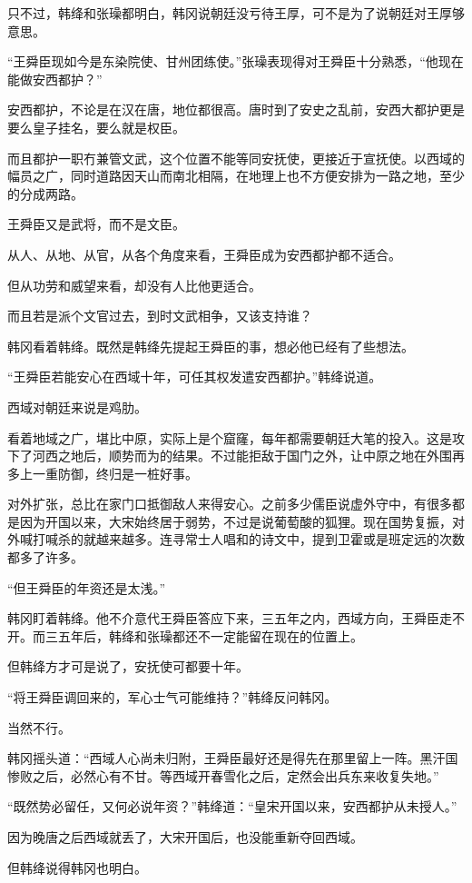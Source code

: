 只不过，韩绛和张璪都明白，韩冈说朝廷没亏待王厚，可不是为了说朝廷对王厚够意思。

“王舜臣现如今是东染院使、甘州团练使。”张璪表现得对王舜臣十分熟悉，“他现在能做安西都护？”

安西都护，不论是在汉在唐，地位都很高。唐时到了安史之乱前，安西大都护更是要么皇子挂名，要么就是权臣。

而且都护一职冇兼管文武，这个位置不能等同安抚使，更接近于宣抚使。以西域的幅员之广，同时道路因天山而南北相隔，在地理上也不方便安排为一路之地，至少的分成两路。

王舜臣又是武将，而不是文臣。

从人、从地、从官，从各个角度来看，王舜臣成为安西都护都不适合。

但从功劳和威望来看，却没有人比他更适合。

而且若是派个文官过去，到时文武相争，又该支持谁？

韩冈看着韩绛。既然是韩绛先提起王舜臣的事，想必他已经有了些想法。

“王舜臣若能安心在西域十年，可任其权发遣安西都护。”韩绛说道。

西域对朝廷来说是鸡肋。

看着地域之广，堪比中原，实际上是个窟窿，每年都需要朝廷大笔的投入。这是攻下了河西之地后，顺势而为的结果。不过能拒敌于国门之外，让中原之地在外围再多上一重防御，终归是一桩好事。

对外扩张，总比在家门口抵御敌人来得安心。之前多少儒臣说虚外守中，有很多都是因为开国以来，大宋始终居于弱势，不过是说葡萄酸的狐狸。现在国势复振，对外喊打喊杀的就越来越多。连寻常士人唱和的诗文中，提到卫霍或是班定远的次数都多了许多。

“但王舜臣的年资还是太浅。”

韩冈盯着韩绛。他不介意代王舜臣答应下来，三五年之内，西域方向，王舜臣走不开。而三五年后，韩绛和张璪都还不一定能留在现在的位置上。

但韩绛方才可是说了，安抚使可都要十年。

“将王舜臣调回来的，军心士气可能维持？”韩绛反问韩冈。

当然不行。

韩冈摇头道：“西域人心尚未归附，王舜臣最好还是得先在那里留上一阵。黑汗国惨败之后，必然心有不甘。等西域开春雪化之后，定然会出兵东来收复失地。”

“既然势必留任，又何必说年资？”韩绛道：“皇宋开国以来，安西都护从未授人。”

因为晚唐之后西域就丢了，大宋开国后，也没能重新夺回西域。

但韩绛说得韩冈也明白。

